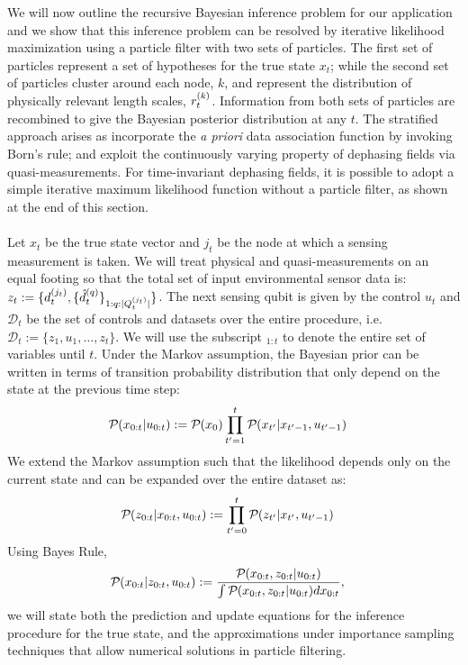 We will now outline the recursive Bayesian inference problem for our application and we show that this inference problem can be resolved by iterative likelihood maximization using a particle filter with two sets of particles. The first set of particles represent a set of hypotheses for the true state $x_t$; while the second set of particles cluster around each node, $k$, and represent the distribution of physically relevant length scales, $r^{( k )}_{t}$. Information from both sets of particles are recombined to give the Bayesian posterior distribution at any $t$. The stratified approach arises as  incorporate the \textit{a priori} data association function by invoking Born's rule; and exploit the continuously varying property of dephasing fields via quasi-measurements. For time-invariant dephasing fields, it is possible to adopt a simple iterative maximum likelihood function without a particle filter, as shown at the end of this section. \\
\\
Let $x_t$ be the true state vector and $j_t$ be the node at which a sensing measurement is taken. We will treat physical and quasi-measurements on an equal footing so that the total set of input environmental sensor data is: $z_t := \{d^{( j_t )}_{t}, \{ \hat{d}^{( q )}_{t} \}_{1:q:|Q^{( j_t )}_{t}|}\}$. The next sensing qubit is given by the control $u_t$ and $\mathcal{D}_t$ be the set of controls and datasets over the entire procedure, i.e. $\mathcal{D}_t := \{z_1, u_1, \hdots, z_t \}$.  We will use the subscript ${}_{1:t}$ to denote the entire set of variables until $t$. Under the Markov assumption, the Bayesian prior can be written in terms of transition probability distribution that only depend on the state at the previous time step:
\begin{align}
\mathcal{P}_{} ( x_{0:t} | u_{0:t} ) & := \mathcal{P}_{} ( x_{0} ) \prod_{t'=1}^{t} \mathcal{P}_{} ( x_{t'}| x_{t'-1}, u_{t'-1}   ) \label{eqn:slam:transition:1}
\end{align} We extend the Markov assumption such that the likelihood depends only on the current state and can be expanded over the entire dataset as:
\begin{align}
\mathcal{P}_{} ( z_{0:t} | x_{0:t}, u_{0:t} ) & := \prod_{t'=0}^{t} \mathcal{P}_{} ( z_{t'} | x_{t'}, u_{t'-1}  ) \label{eqn:slam:likelihood:1}
\end{align}  Using Bayes Rule,
\begin{align}
\mathcal{P}_{} ( x_{0:t} | z_{0:t} , u_{0:t} ) &:= \frac{\mathcal{P}_{} ( x_{0:t} , z_{0:t} | u_{0:t} )}{\int \mathcal{P}_{} ( x_{0:t} , z_{0:t} | u_{0:t} ) dx_{0:t}}, \label{eqn:slam:bayes:1}
\end{align} we will state both the prediction and update equations for the inference procedure for the true state, and the approximations under importance sampling techniques that allow numerical solutions  in particle filtering. \\
